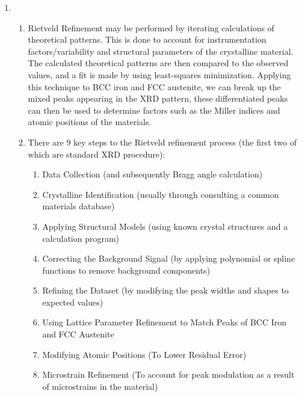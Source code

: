 \begin{enumerate}
\begin{enumerate}
    \end{enumerate}

  \item

    \begin{enumerate}

      \item Rietveld Refinement may be performed by iterating calculations of theoretical patterns. This is done to account for instrumentation factors/variability and structural parameters of the crystalline material. The calculated theoretical patterns are then compared to the observed values, and a fit is made by using least-squares minimization. Applying this technique to BCC iron and FCC austenite, we can break up the mixed peaks appearing in the XRD pattern, these differentiated peaks can then be used to determine factors such as the Miller indices and atomic positions of the materials.

      \item There are 9 key steps to the Rietveld refinement process (the first two of which are standard XRD procedure):

        \begin{enumerate}

          \item Data Collection (and subsequently Bragg angle calculation)

          \item Crystalline Identification (usually through consulting a common materials database)

          \item Applying Structural Models (using known crystal structures and a calculation program)

          \item Correcting the Background Signal (by applying polynomial or spline functions to remove background components)

          \item Refining the Dataset (by modifying the peak widths and shapes to expected values)

          \item Using Lattice Parameter Refinement to Match Peaks of BCC Iron and FCC Austenite

          \item Modifying Atomic Positions (To Lower Residual Error)

          \item Microstrain Refinement (To account for peak modulation as a result of microstrains in the material)


\end{enumerate}
\end{enumerate}
\end{enumerate}
